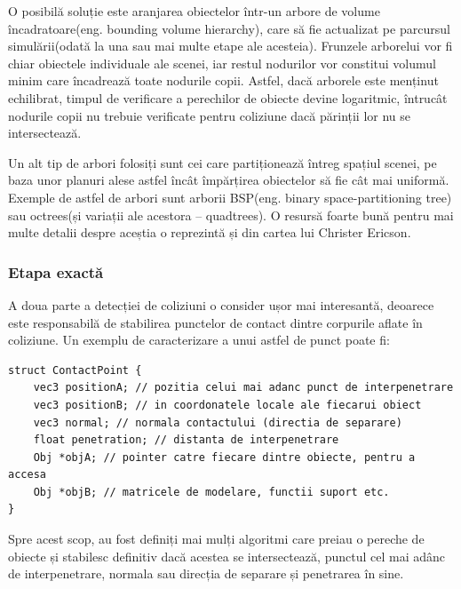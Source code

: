 \documentclass[12pt,a4paper]{report}
\begin{document}
O posibilă soluție este aranjarea obiectelor într-un arbore de volume încadratoare(eng. bounding volume hierarchy), care să fie actualizat pe parcursul simulării(odată la una sau mai multe etape ale acesteia). Frunzele arborelui vor fi chiar obiectele individuale ale scenei, iar restul nodurilor vor constitui volumul minim care încadrează toate nodurile copii. Astfel, dacă arborele este menținut echilibrat, timpul de verificare a perechilor de obiecte devine logaritmic, întrucât nodurile copii nu trebuie verificate pentru coliziune dacă părinții lor nu se intersectează.

Un alt tip de arbori folosiți sunt cei care partiționează întreg spațiul scenei, pe baza unor planuri alese astfel încât împărțirea obiectelor să fie cât mai uniformă. Exemple de astfel de arbori sunt arborii BSP(eng. binary space-partitioning tree) sau octrees(și variații ale acestora -- quadtrees). O resursă foarte bună pentru mai multe detalii despre aceștia o reprezintă \cite[Cap. 6. Bounding Volume Hierarchies]{real_time_collision_detection} și \cite[Cap. 7. Spatial Partitioning]{real_time_collision_detection} din cartea lui Christer Ericson.

\subsubsection{Etapa exactă}
A doua parte a detecției de coliziuni o consider ușor mai interesantă, deoarece este responsabilă de stabilirea punctelor de contact dintre corpurile aflate în coliziune. Un exemplu de caracterizare a unui astfel de punct poate fi:
\begin{lstlisting}[style=myC++]
struct ContactPoint {
	vec3 positionA; // pozitia celui mai adanc punct de interpenetrare
	vec3 positionB; // in coordonatele locale ale fiecarui obiect
	vec3 normal; // normala contactului (directia de separare)
	float penetration; // distanta de interpenetrare
	Obj *objA; // pointer catre fiecare dintre obiecte, pentru a accesa
	Obj *objB; // matricele de modelare, functii suport etc.
}
\end{lstlisting}
Spre acest scop, au fost definiți mai mulți algoritmi care preiau o pereche de obiecte și stabilesc definitiv dacă acestea se intersectează, punctul cel mai adânc de interpenetrare, normala sau direcția de separare și penetrarea în sine.
\end{document}
